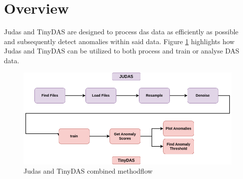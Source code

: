 \section{Overview}

Judas and TinyDAS are designed to process \acrshort{das} data as efficiently as possible and subsequently detect anomalies within said data. Figure \ref{fig:judasnet_overview} highlights how Judas and TinyDAS can be utilized to both process and train or analyse DAS data.

\begin{figure}[!h]
    \centering
    \includegraphics[scale=.4]{figures/api_overview.png}
    \caption{Judas and TinyDAS combined methodflow}
    \label{fig:judasnet_overview}
\end{figure}